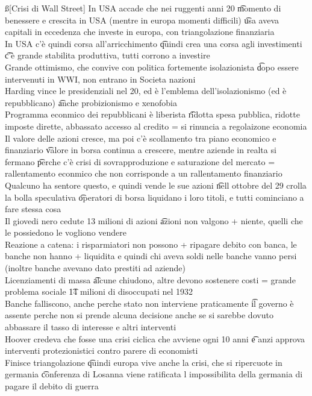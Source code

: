 \documentclass[12pt]{article}
\begin{document}
\ss[Crisi di Wall Street]
In USA accade che nei ruggenti anni 20 \t momento di benessere e crescita in USA (mentre in europa momenti difficili) \t usa aveva capitali in eccedenza che investe in europa, con triangolazione finanziaria \\
In USA c'è quindi corsa all'arricchimento \t quindi crea una corsa agli investimenti \t c'è grande stabilita produttiva, tutti corrono a investire \\
Grande ottimismo, che convive con politica fortemente isolazionista \t dopo essere intervenuti in WWI, non entrano in Societa nazioni \\
Harding vince le presidenziali nel 20, ed è l'emblema dell'isolazionismo (ed è repubblicano) \t anche probizionismo e xenofobia \\
Programma econmico dei repubblicani è liberista \t ridotta spesa pubblica, ridotte imposte dirette, abbassato accesso al credito = si rinuncia a regolaizone economia \\
Il valore delle azioni cresce, ma poi c'è scollamento tra piano economico e finanziario \t valore in borsa continua a crescere, mentre aziende in realta si fermano \t perche c'è crisi di sovrapproduzione e saturazione del mercato = rallentamento econmico che non corrisponde a un rallentamento finanziario \\
Qualcuno ha sentore questo, e quindi vende le sue azioni \t nell ottobre del 29 crolla la bolla speculativa \t operatori di borsa liquidano i loro titoli, e tutti cominciano a fare stessa cosa \\
Il giovedi nero cedute 13 milioni di azioni \t azioni non valgono + niente, quelli che le possiedono le vogliono vendere \\
Reazione a catena: i risparmiatori non possono + ripagare debito con banca, le banche non hanno + liquidita e quindi chi aveva soldi nelle banche vanno persi (inoltre banche avevano dato prestiti ad aziende) \\
Licenziamenti di massa \t alcune chiudono, altre devono sostenere costi = grande problema sociale \t 14 milioni di disoccupati nel 1932 \\
Banche falliscono, anche perche stato non interviene praticamente \t il governo è assente perche non si prende alcuna decisione anche se si sarebbe dovuto abbassare il tasso di interesse e altri interventi \\
Hoover credeva che fosse una crisi ciclica che avviene ogni 10 anni \t e anzi approva interventi protezionistici contro parere di economisti \\
Finisce triangolazione \t quindi europa vive anche la crisi, che si ripercuote in germania \t conferenza di Losanna viene ratificata l impossibilita della germania di pagare il debito di guerra
\end{document}
